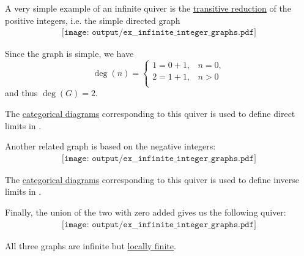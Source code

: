 \begin{example}\label{ex:infinite_integer_graphs}
  A very simple example of an infinite quiver is the \hyperref[def:relation_closures/transitive]{transitive reduction} of the positive integers, i.e. the simple directed graph
  \begin{equation}\label{eq:ex:infinite_integer_graphs/positive}
    \begin{aligned}
      \texttt{[image: output/ex\_\_infinite\_integer\_graphs.pdf]}
    \end{aligned}
  \end{equation}

  Since the graph is simple, we have
  \begin{equation*}
    \deg(n) = \begin{cases}
      1 = 0 + 1, &n = 0, \\
      2 = 1 + 1, &n > 0 \\
    \end{cases}
  \end{equation*}
  and thus \( \deg(G) = 2 \).

  The \hyperref[def:categorical_diagram]{categorical diagrams} corresponding to this quiver is used to define direct limits in .

  Another related graph is based on the negative integers:
  \begin{equation}\label{eq:ex:infinite_integer_graphs/negative}
    \begin{aligned}
      \texttt{[image: output/ex\_\_infinite\_integer\_graphs.pdf]}
    \end{aligned}
  \end{equation}

  The \hyperref[def:categorical_diagram]{categorical diagrams} corresponding to this quiver is used to define inverse limits in .

  Finally, the union of the two with zero added gives us the following quiver:
  \begin{equation}\label{eq:ex:infinite_integer_graphs/two_sided}
    \begin{aligned}
      \texttt{[image: output/ex\_\_infinite\_integer\_graphs.pdf]}
    \end{aligned}
  \end{equation}

  All three graphs are infinite but \hyperref[def:hypergraph/degree]{locally finite}.
\end{example}

